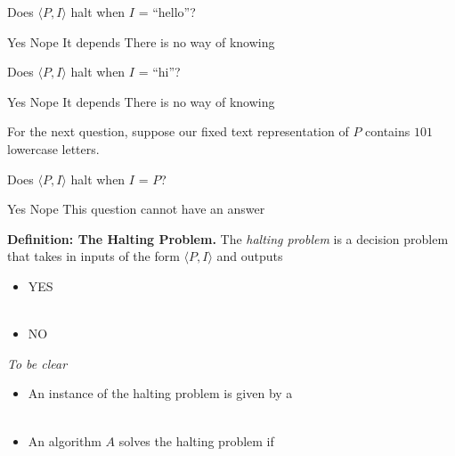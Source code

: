 \documentclass[11  pt]{article}
\begin{document}
\begin{Qu}
    Does $\langle P, I\rangle$ halt when $I$ = ``hello''?
    \begin{itemize}
        \aitem Yes
        \bitem Nope
        \citem It depends
        \ditem There is no way of knowing
    \end{itemize}
\end{Qu}

\begin{Qu}
Does $\langle P, I\rangle$ halt when $I$ = ``hi''?
    \begin{itemize}
        \aitem Yes
        \bitem Nope
        \citem It depends
        \ditem There is no way of knowing
    \end{itemize}
\end{Qu}

For the next question, suppose our fixed text representation of $P$ contains $101$ lowercase letters.
\begin{Qu}
    Does $\langle P, I\rangle$ halt when $I$ = $P$?
    \begin{itemize}
        \aitem Yes
        \bitem Nope
        \citem This question cannot have an answer
    \end{itemize}
\end{Qu}

\vspace{1cm}

\newpage

\textbf{Definition: The Halting Problem.} The \emph{halting problem} is a decision problem that takes in inputs of the form $\langle P, I \rangle$ and outputs
\begin{itemize}
    \item YES \\ \\%
    \item NO \\%
\end{itemize}

\emph{To be clear}
\begin{itemize}
    \item An instance of the halting problem is given by a \\ \\
    \item An algorithm $A$ solves the halting problem if
\end{itemize}
\end{document}
